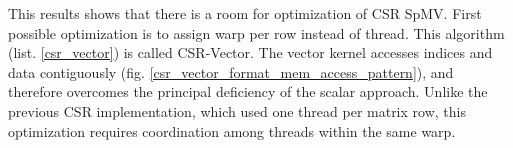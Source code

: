 \documentclass{article}
\begin{document}
This results shows that there is a room for optimization of CSR SpMV. First possible optimization is to assign warp per row instead of thread.
This algorithm (list. \ref{csr_vector}) is called CSR-Vector. The vector kernel accesses indices and data contiguously (fig. \ref{csr_vector_format_mem_access_pattern}), 
and therefore overcomes the principal deficiency of the scalar approach. Unlike the previous CSR implementation, which used one thread per matrix row, this optimization requires
coordination among threads within the same warp. 

\begin{figure}[H]
\centering
{}
\qquad %
\end{figure}
\end{document}
